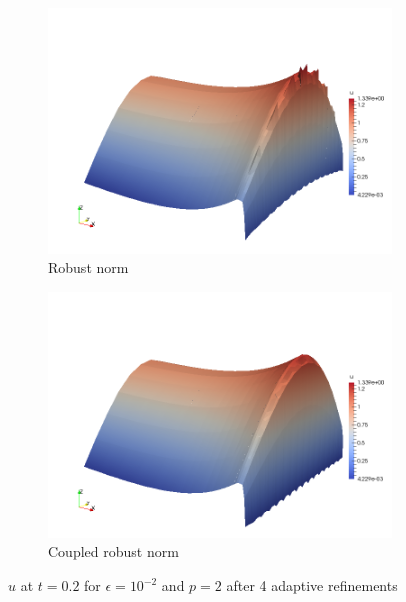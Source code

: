 \documentclass{article}
\theoremstyle{definition}
\theoremstyle{remark}
\begin{document}
\begin{figure}[ht]
\centering
\begin{subfigure}[t]{0.48\textwidth}
\centering
\includegraphics[width=\textwidth]{Confusion/Robustness/TransientConfusion2D_Robust_1e=2_p2_t02.png}
\caption{Robust norm}
\end{subfigure}
\begin{subfigure}[t]{0.48\textwidth}
\centering
\includegraphics[width=\textwidth]{Confusion/Robustness/TransientConfusion2D_CoupledRobust_1e=2_p2_t02.png}
\caption{Coupled robust norm}
\end{subfigure}
\caption{$u$ at $t=0.2$ for $\epsilon=10^{-2}$ and $p=2$ after 4 adaptive refinements}
\label{fig:surfacePlots}
\end{figure}
\end{document}

